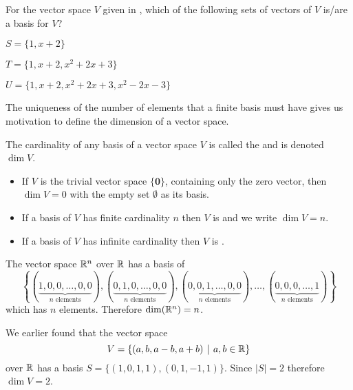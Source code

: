 \begin{exercise}
    For the vector space $V$ given in , which of the following sets of vectors of $V$ is/are a basis for $V$?
    \begin{partquestions}{\alph*}
        \item $S = \{1, x + 2\}$
        \item $T = \{1, x + 2, x^2 + 2x + 3\}$
        \item $U = \{1, x + 2, x^2 + 2x + 3, x^2 - 2x - 3\}$
    \end{partquestions}
\end{exercise}

The uniqueness of the number of elements that a finite basis must have gives us motivation to define the dimension of a vector space.

\newpage

\begin{definition}
    The cardinality of any basis of a vector space $V$ is called the  and is denoted $\dim{V}$.
    \begin{itemize}
        \item If $V$ is the trivial vector space $\{\textbf{0}\}$, containing only the zero vector, then $\dim{V} = 0$ with the empty set $\emptyset$ as its basis.
        \item If a basis of $V$ has finite cardinality $n$ then $V$ is  and we write $\dim{V} = n$.
        \item If a basis of $V$ has infinite cardinality then $V$ is .
    \end{itemize}
\end{definition}

\begin{example}
    The vector space $\mathbb{R}^n$ over $\mathbb{R}$ has a basis of
    \[
        \left\{(\underbrace{1, 0, 0, \dots, 0, 0}_{n \text{ elements}}), (\underbrace{0, 1, 0, \dots, 0, 0}_{n \text{ elements}}), (\underbrace{0, 0, 1, \dots, 0, 0}_{n \text{ elements}}), \dots, (\underbrace{0, 0, 0, \dots, 1}_{n \text{ elements}})\right\}
    \]
    which has $n$ elements. Therefore $\dim{\R^n} = n$.
\end{example}

\begin{example}
    We earlier found that the vector space
    \[
        V = \{(a, b, a-b, a+b) \vert a, b \in \R\}
    \]
    over $\mathbb{R}$ has a basis $S = \{(1, 0, 1, 1), (0, 1, -1, 1)\}$. Since $|S| = 2$ therefore $\dim{V} = 2$.
\end{example}

